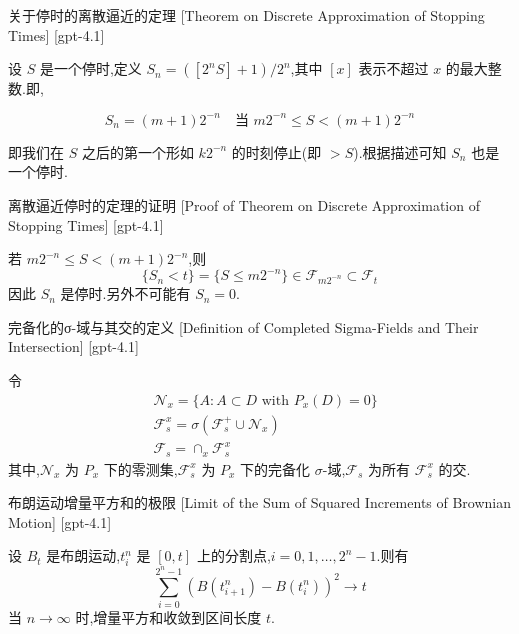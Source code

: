 \documentclass[UTF8]{ctexart}
\begin{document}
    
    
    \begin{thm}
        {关于停时的离散逼近的定理}
        [Theorem on Discrete Approximation of Stopping Times]
        [gpt-4.1]
        
设 $S$ 是一个停时,定义 $S_{n} = ( [ 2^{n} S ] + 1 ) / 2^{n}$,其中 $[x]$ 表示不超过 $x$ 的最大整数.即,

\[
S_{n} = (m + 1) 2^{-n} \quad \text{当 } m 2^{-n} \leq S < (m + 1) 2^{-n}
\]

即我们在 $S$ 之后的第一个形如 $k 2^{-n}$ 的时刻停止(即 $>S$).根据描述可知 $S_n$ 也是一个停时.

    \end{thm}
    
    
    
    \begin{prf}
        {离散逼近停时的定理的证明}
        [Proof of Theorem on Discrete Approximation of Stopping Times]
        [gpt-4.1]
        
若 $m 2^{-n} \leq S < (m + 1) 2^{-n}$,则
\[
\{ S_{n} < t \} = \{ S \leq m 2^{-n} \} \in \mathcal{F}_{m 2^{-n}} \subset \mathcal{F}_{t}
\]
因此 $S_n$ 是停时.另外不可能有 $S_n = 0$.

    \end{prf}
    
    
    
    \begin{dfn}
        {完备化的σ-域与其交的定义}
        [Definition of Completed Sigma-Fields and Their Intersection]
        [gpt-4.1]
        
令
\[
\begin{array}{rl}
& \mathcal{N}_x = \{ A : A \subset D \text{ with } P_x(D) = 0 \} \\
& \mathcal{F}_s^x = \sigma(\mathcal{F}_s^+ \cup \mathcal{N}_x) \\
& \mathcal{F}_s = \cap_x \mathcal{F}_s^x
\end{array}
\]
其中,$\mathcal{N}_x$ 为 $P_x$ 下的零测集,$\mathcal{F}_s^x$ 为 $P_x$ 下的完备化 $\sigma$-域,$\mathcal{F}_s$ 为所有 $\mathcal{F}_s^x$ 的交.

    \end{dfn}
    
    
    
    \begin{thm}
        {布朗运动增量平方和的极限}
        [Limit of the Sum of Squared Increments of Brownian Motion]
        [gpt-4.1]
        
设 $B_t$ 是布朗运动,$t^n_i$ 是 $[0,t]$ 上的分割点,$i=0,1,\ldots,2^n-1$.则有
\[
\sum_{i=0}^{2^{n}-1} \left(B(t^{n}_{i+1})-B(t^{n}_i)\right)^2 \to t
\]
当 $n\to\infty$ 时,增量平方和收敛到区间长度 $t$.

    \end{thm}
    
\end{document}
